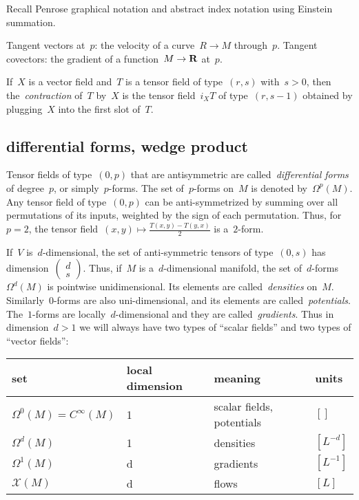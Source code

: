 Recall Penrose graphical notation and abstract index notation using Einstein
summation.

Tangent vectors at~$p$: the velocity of a curve~$R\to M$
through~$p$.  Tangent covectors: the gradient of a function~$M\to\mathbf{R}$ at~$p$.

If~$X$ is a vector field and~$T$ is a tensor field of type~$(r,s)$
with~$s>0$, then the~\emph{contraction} of~$T$ by~$X$ is the tensor
field~$i_XT$ of
type~$(r,s-1)$ obtained by plugging~$X$ into the first slot of~$T$.

\subsection{differential forms, wedge product}

Tensor fields of type~$(0,p)$ that are antisymmetric are
called~\emph{differential forms} of degree~$p$, or simply~$p$-forms.
The set of~$p$-forms on~$M$ is denoted by~$\Omega^p(M)$.
Any tensor field of type~$(0,p)$ can be anti-symmetrized by summing over all
permutations of its inputs, weighted by the sign of each permutation.  Thus,
for~$p=2$, the tensor field~$(x,y)\mapsto\frac{T(x,y)-T(y,x)}2$ is
a~$2$-form.

If~$V$ is~$d$-dimensional, the set of anti-symmetric tensors of type~$(0,s)$ has
dimension~$\begin{pmatrix}d\\s\end{pmatrix}$.  Thus, if~$M$ is
a~$d$-dimensional manifold, the set of~$d$-forms~$\Omega^d(M)$ is pointwise
unidimensional.  Its elements are called~\emph{densities} on~$M$.
Similarly~$0$-forms are also uni-dimensional, and its elements are
called~\emph{potentials}.  The~$1$-forms are locally~$d$-dimensional and they
are called~\emph{gradients}.  Thus in dimension~$d>1$ we will always have two
types of ``scalar fields'' and two types of ``vector fields'':

\begin{tabular}{l|l|l|l}
	set & local dimension & meaning & units \\
	\hline
	$\Omega^0(M)=C^\infty(M)$ & 1 & scalar fields, potentials & $[]$ \\
	$\Omega^d(M)$ & 1 & densities & $[L^{-d}]$ \\
	$\Omega^1(M)$ & d & gradients & $[L^{-1}]$ \\
	$\mathcal{X}(M)$ & d& flows & $[L]$ \\
\end{tabular}

